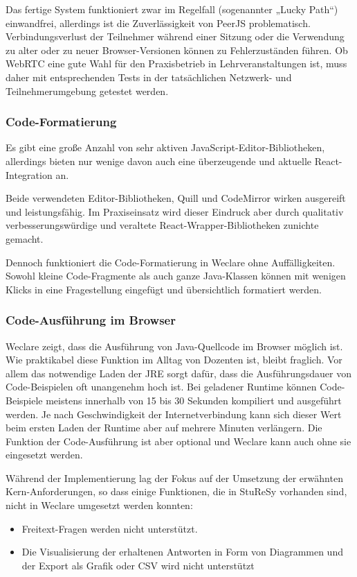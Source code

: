 Das fertige System funktioniert zwar im Regelfall (sogenannter „Lucky Path“) einwandfrei, allerdings ist die Zuverlässigkeit von PeerJS problematisch. Verbindungsverlust der Teilnehmer während einer Sitzung oder die Verwendung zu alter oder zu neuer Browser-Versionen können zu Fehlerzuständen führen. Ob WebRTC eine gute Wahl für den Praxisbetrieb in Lehrveranstaltungen ist, muss daher mit entsprechenden Tests in der tatsächlichen Netzwerk- und Teilnehmerumgebung getestet werden.

\subsubsection*{Code-Formatierung}
Es gibt eine große Anzahl von sehr aktiven JavaScript-Editor-Bibliotheken, allerdings bieten nur wenige davon auch eine überzeugende und aktuelle React-Integration an.

Beide verwendeten Editor-Bibliotheken, Quill und CodeMirror wirken ausgereift und leistungsfähig. Im Praxiseinsatz wird dieser Eindruck aber durch qualitativ verbesserungswürdige und veraltete React-Wrapper-Bibliotheken zunichte gemacht.

Dennoch funktioniert die Code-Formatierung in Weclare ohne Auffälligkeiten. Sowohl kleine Code-Fragmente als auch ganze Java-Klassen können mit wenigen Klicks in eine Fragestellung eingefügt und übersichtlich formatiert werden.

\subsubsection*{Code-Ausführung im Browser}
Weclare zeigt, dass die Ausführung von Java-Quellcode im Browser möglich ist. Wie praktikabel diese Funktion im Alltag von Dozenten ist, bleibt fraglich. Vor allem das notwendige Laden der JRE sorgt dafür, dass die Ausführungsdauer von Code-Beispielen oft unangenehm hoch ist. Bei geladener Runtime können Code-Beispiele meistens innerhalb von 15 bis 30 Sekunden kompiliert und ausgeführt werden. Je nach Geschwindigkeit der Internetverbindung kann sich dieser Wert beim ersten Laden der Runtime aber auf mehrere Minuten verlängern. Die Funktion der Code-Ausführung ist aber optional und Weclare kann auch ohne sie eingesetzt werden.

Während der Implementierung lag der Fokus auf der Umsetzung der erwähnten Kern-Anforderungen, so dass einige Funktionen, die in StuReSy vorhanden sind, nicht in Weclare umgesetzt werden konnten:
\begin{itemize}
    \item Freitext-Fragen werden nicht unterstützt.
    \item Die Visualisierung der erhaltenen Antworten in Form von Diagrammen und der Export als Grafik oder CSV wird nicht unterstützt
\end{itemize}

